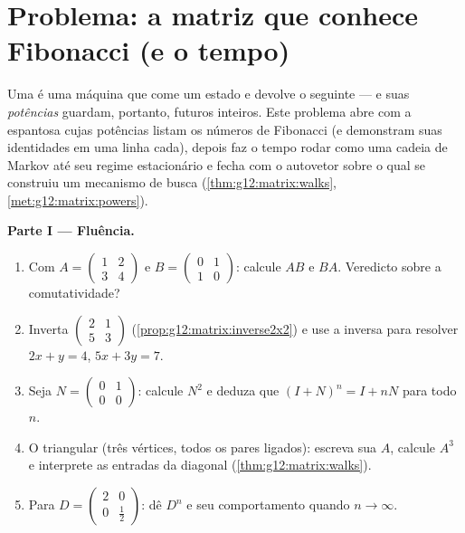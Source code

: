 \section{Problema: a matriz que conhece Fibonacci (e o tempo)}

\begin{problem}
\label{pb:g12:matrix:1}
Uma  é uma máquina que come um estado e devolve o
seguinte --- e suas \emph{potências} guardam, portanto, futuros
inteiros. Este problema abre com a espantosa  cujas
potências listam os números de Fibonacci (e demonstram suas
identidades em uma linha cada), depois faz o tempo rodar como
uma cadeia de Markov até seu regime estacionário e fecha com o
autovetor sobre o qual se construiu um mecanismo de busca
(\cref{thm:g12:matrix:walks},
\cref{met:g12:matrix:powers}).

\medskip
\noindent\textbf{Parte I --- Fluência.}
\begin{enumerate}
  \item Com $A = \begin{pmatrix} 1 & 2\\ 3 & 4\end{pmatrix}$
        e $B = \begin{pmatrix} 0 & 1\\ 1 & 0\end{pmatrix}$:
        calcule $AB$ e $BA$. Veredicto sobre a comutatividade?
  \item Inverta $\begin{pmatrix} 2 & 1\\ 5 & 3\end{pmatrix}$
        (\cref{prop:g12:matrix:inverse2x2}) e use a inversa
        para resolver $2x + y = 4$, $5x + 3y = 7$.
  \item Seja $N = \begin{pmatrix} 0 & 1\\ 0 & 0\end{pmatrix}$:
        calcule $N^2$ e deduza que
        $(I + N)^n = I + nN$ para todo $n$.
  \item O  triangular (três vértices, todos os pares
        ligados): escreva sua  $A$, calcule
        $A^3$ e interprete as entradas da diagonal
        (\cref{thm:g12:matrix:walks}).
  \item Para $D = \begin{pmatrix} 2 & 0\\ 0 & \frac12
        \end{pmatrix}$: dê $D^n$ e seu comportamento quando
        $n \to \infty$.
\end{enumerate}


\end{problem}
